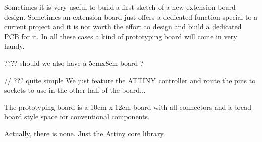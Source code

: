 
Sometimes it is very useful to build a first sketch of a new extension board design. Sometimes an extension board just offers a dedicated function special to a current project and it is not worth the effort to design and build a dedicated PCB for it. In all these cases a kind of prototyping board will come in very handy.

???? should we also have a 5cmx8cm board ?


// ??? quite simple We just feature the ATTINY controller and route the pins to sockets to use in the other half of the board...



The prototyping board is a 10cm x 12cm board with all connectors and a bread board style space for conventional components.



Actually, there is none. Just the Attiny core library.



